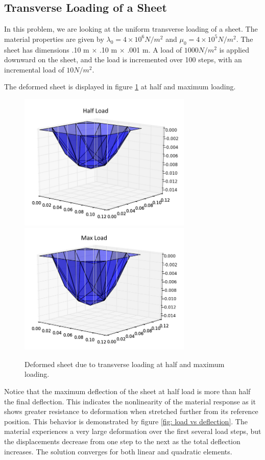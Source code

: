 \documentclass[]{spie}  %
\begin{document}
\subsection{Transverse Loading of a Sheet}
In this problem, we are looking at the uniform transverse loading of a sheet. The material properties are given by $\lambda_0 = 4 \times 10^6 N/m^2$ and $\mu_0 = 4 \times 10^5 N/m^2$. The sheet has dimensions .10 m $\times$ .10 m $\times$ .001 m. A load of $1000 N/m^2$ is applied downward on the sheet, and the load is incremented over 100 steps, with an incremental load of $10 N/m^2$. 

The deformed sheet is displayed in figure \ref{fig: transverse loading} at half and maximum loading. 
\begin{figure}[h]
	\centering
	\includegraphics[width=3.25in]{deformed_sheet_half_load.png} \quad
	\includegraphics[width=3.25in]{deformed_sheet_max_load.png} 
	\caption{Deformed sheet due to transverse loading at half and maximum loading.} 
	\label{fig: transverse loading}
\end{figure}
Notice that the maximum deflection of the sheet at half load is more than half the final deflection. This indicates the nonlinearity of the material response as it shows greater resistance to deformation when stretched further from its reference position. This behavior is demonstrated by figure \ref{fig: load vs deflection}. The material experiences a very large deformation over the first several load steps, but the displacements decrease from one step to the next as the total deflection increases. The solution converges for both linear and quadratic elements. 
\end{document}
